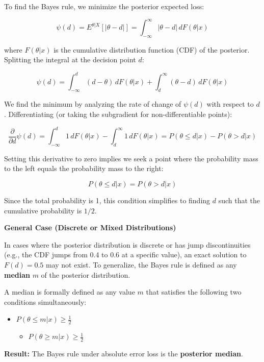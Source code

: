 \documentclass[
  letterpaper,
  DIV=11,
  numbers=noendperiod]{scrreprt}
\providecommand{\tightlist}{%
  \setlength{\itemsep}{0pt}\setlength{\parskip}{0pt}}
\renewcommand{\[}{\begin{equation}}
\renewcommand{\]}{\end{equation}}
\theoremstyle{definition}
\theoremstyle{plain}
\theoremstyle{plain}
\theoremstyle{plain}
\theoremstyle{definition}
\theoremstyle{plain}
\theoremstyle{remark}
\begin{document}
To find the Bayes rule, we minimize the posterior expected loss:

\[
\psi(d) = E^{\theta|X} [ |\theta - d| ] = \int_{-\infty}^{\infty} |\theta - d| \, dF(\theta|x)
\]

where \(F(\theta|x)\) is the cumulative distribution function (CDF) of
the posterior. Splitting the integral at the decision point \(d\):

\[
\psi(d) = \int_{-\infty}^{d} (d - \theta) \, dF(\theta|x) + \int_{d}^{\infty} (\theta - d) \, dF(\theta|x)
\]

We find the minimum by analyzing the rate of change of \(\psi(d)\) with
respect to \(d\). Differentiating (or taking the subgradient for
non-differentiable points):

\[
\frac{\partial}{\partial d} \psi(d) = \int_{-\infty}^{d} 1 \, dF(\theta|x) - \int_{d}^{\infty} 1 \, dF(\theta|x) = P(\theta \le d|x) - P(\theta > d|x)
\]

Setting this derivative to zero implies we seek a point where the
probability mass to the left equals the probability mass to the right:

\[
P(\theta \le d|x) = P(\theta > d|x)
\]

Since the total probability is 1, this condition simplifies to finding
\(d\) such that the cumulative probability is \(1/2\).

\textbf{General Case (Discrete or Mixed Distributions)}

In cases where the posterior distribution is discrete or has jump
discontinuities (e.g., the CDF jumps from 0.4 to 0.6 at a specific
value), an exact solution to \(F(d) = 0.5\) may not exist. To
generalize, the Bayes rule is defined as any \textbf{median} \(m\) of
the posterior distribution.

A median is formally defined as any value \(m\) that satisfies the
following two conditions simultaneously:

\begin{itemize}
\tightlist
\item
  \(P(\theta \le m|x) \ge \frac{1}{2}\)

  \begin{itemize}
  \tightlist
  \item
    \(P(\theta \ge m|x) \ge \frac{1}{2}\)
  \end{itemize}
\end{itemize}

\textbf{Result:} The Bayes rule under absolute error loss is the
\textbf{posterior median}.
\end{document}
